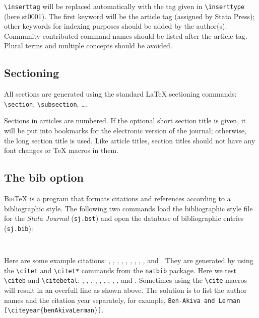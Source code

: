 \verb+\inserttag+ will be replaced automatically with the tag
given in \verb+\inserttype+ (here st0001). The first keyword will be the
article tag (assigned by Stata Press); other keywords for indexing purposes
should be added by the author(s). Community-contributed command names should
be listed after the article tag. Plural terms and multiple concepts should be
avoided.

\subsection{Sectioning}

All sections are generated using the standard {\LaTeX} sectioning commands:\\
\verb+\section+, \verb+\subsection+, \dots.

Sections in articles are numbered.  If the optional short section title is
given, it will be put into bookmarks for the electronic version of the
journal; otherwise, the long section title is used.  Like article titles,
section titles should not have any font changes or {\TeX} macros in them.

\subsection{The bib option}

\textsc{Bib}{\TeX} is a program that formats citations and references
according to a bibliographic style.  The following two commands load the
bibliographic style file for the {\sl Stata Journal\/} (\texttt{sj.bst}) and
open the database of bibliographic entries (\texttt{sj.bib}):

\begin{stverbatim}
\begin{verbatim}


\end{verbatim}
\end{stverbatim}

Here are some example citations:
%
\citet{akaike}, \citet*{benAkivaLerman}, \citet{dykePatterson},
\citet{greene03},
\citet*{kendallstuart}, \citet{hilbe93a}, \citet{hilbe94}, \citet{hilbe93b},
\citet{maddala83}, and \citet*{latexcompanion}.
%
They are generated by using
the \verb+\citet+ and \verb+\citet*+ commands from the \texttt{natbib}
package.  Here we test \verb+\citeb+ and \verb+\citebetal+:
%
, , ,
, , , ,
, , and .
Sometimes using the \verb+\cite+ macros will result in an overfull line as
shown above.  The solution is to list the author names and the citation year
separately, for example,
\verb+Ben-Akiva and Lerman [\citeyear{benAkivaLerman}]+.

